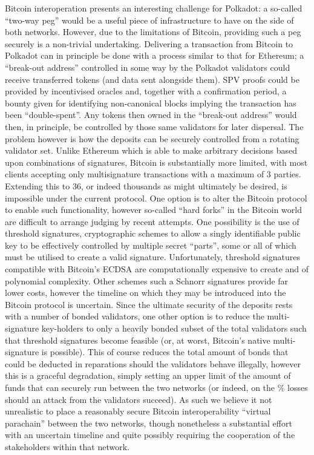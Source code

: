 Bitcoin interoperation presents an interesting challenge for Polkadot: a
so-called ``two-way peg'' would be a useful piece of infrastructure to
have on the side of both networks. However, due to the limitations of
Bitcoin, providing such a peg securely is a non-trivial undertaking.
Delivering a transaction from Bitcoin to Polkadot can in principle be
done with a process similar to that for Ethereum; a ``break-out
address'' controlled in some way by the Polkadot validators could
receive transferred tokens (and data sent alongside them). SPV proofs
could be provided by incentivised oracles and, together with a
confirmation period, a bounty given for identifying non-canonical blocks
implying the transaction has been ``double-spent''. Any tokens then
owned in the ``break-out address'' would then, in principle, be
controlled by those same validators for later dispersal. The problem
however is how the deposits can be securely controlled from a rotating
validator set. Unlike Ethereum which is able to make arbitrary decisions
based upon combinations of signatures, Bitcoin is substantially more
limited, with most clients accepting only multisignature transactions
with a maximum of 3 parties. Extending this to 36, or indeed thousands
as might ultimately be desired, is impossible under the current
protocol. One option is to alter the Bitcoin protocol to enable such
functionality, however so-called ``hard forks'' in the Bitcoin world are
difficult to arrange judging by recent attempts. One possibility is the
use of threshold signatures, cryptographic schemes to allow a singly
identifiable public key to be effectively controlled by multiple secret
``parts'', some or all of which must be utilised to create a valid
signature. Unfortunately, threshold signatures compatible with Bitcoin's
ECDSA are computationally expensive to create and of polynomial
complexity. Other schemes such a Schnorr signatures provide far lower
costs, however the timeline on which they may be introduced into the
Bitcoin protocol is uncertain. Since the ultimate security of the
deposits rests with a number of bonded validators, one other option is
to reduce the multi-signature key-holders to only a heavily bonded
subset of the total validators such that threshold signatures become
feasible (or, at worst, Bitcoin's native multi-signature is possible).
This of course reduces the total amount of bonds that could be deducted
in reparations should the validators behave illegally, however this is a
graceful degradation, simply setting an upper limit of the amount of
funds that can securely run between the two networks (or indeed, on the
\% losses should an attack from the validators succeed). As such we
believe it not unrealistic to place a reasonably secure Bitcoin
interoperability ``virtual parachain'' between the two networks, though
nonetheless a substantial effort with an uncertain timeline and quite
possibly requiring the cooperation of the stakeholders within that
network.

